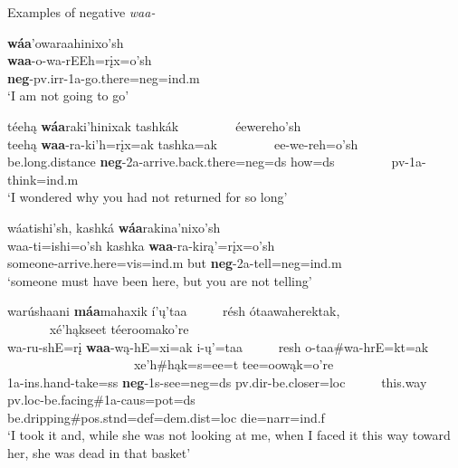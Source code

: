 \begin{exe}
\item\label{waanegation} Examples of negative \textit{waa-}

	\begin{xlist}
	
	\item\label{waanegation1}
	\glll \textbf{wáa}'owaraahinixo'sh\\
	\textbf{waa}-o-wa-rEEh=rįx=o'sh\\
	\textbf{neg}-pv.irr-1a-\textnormal{go.there}=neg=ind.m\\
	\glt `I am not going to go' \citep[48]{hollow1973a}
	
	\item\label{waanegation2}
	\glll téehą \textbf{wáa}raki'hinixak tashkák ~ ~ ~ ~ ~ éewereho'sh\\
	teehą \textbf{waa}-ra-ki'h=rįx=ak tashka=ak ~ ~ ~ ~ ~  ee-we-reh=o'sh\\
	\textnormal{be.long.distance} \textbf{neg}-2a-\textnormal{arrive.back.there}=neg=ds \textnormal{how}=ds ~ ~ ~ ~ ~ pv-1a-\textnormal{think}=ind.m\\
	\glt `I wondered why you had not returned for so long' \citep[318]{hollow1973b}
	
	\item\label{waanegation3}
	\glll wáatishi'sh, kashká \textbf{wáa}rakina'nixo'sh\\
	waa-ti=ishi=o'sh kashka \textbf{waa}-ra-kirą'=rįx=o'sh\\
	\textnormal{someone}-\textnormal{arrive.here}=vis=ind.m \textnormal{but} \textbf{neg}-2a-\textnormal{tell}=neg=ind.m\\
	\glt `someone must have been here, but you are not telling' \citep[162]{hollow1973a}

	\item\label{waanegation4}
	\glll warúshaani \textbf{máa}mahaxik í'ų'taa ~ ~ ~    résh ótaawaherektak, ~ ~ ~ ~ ~ ~ ~ ~ ~ ~ ~ ~ ~ ~ ~ xé'hąkseet téeroomako're\\
	wa-ru-shE=rį \textbf{waa}-wą-hE=xi=ak i-ų'=taa ~ ~ ~ resh o-taa\#wa-hrE=kt=ak ~ ~ ~ ~ ~ ~ ~ ~ ~ ~ ~ ~ ~ ~ ~ xe'h\#hąk=s=ee=t tee=oowąk=o're\\
	1a-ins.hand-\textnormal{take}=ss \textbf{neg}-1s-\textnormal{see}=neg=ds pv.dir-\textnormal{be.closer}=loc ~ ~ ~ \textnormal{this.way} pv.loc-\textnormal{be.facing}\#1a-caus=pot=ds ~ ~ ~ ~ ~ ~ ~ ~ ~ ~ ~ ~ ~ ~ ~ \textnormal{be.dripping}\#pos.stnd=def=dem.dist=loc \textnormal{die}=narr=ind.f\\
	\glt `I took it and, while she was not looking at me, when I faced it this way toward her, she was dead in that basket' \citep[92]{hollow1973a}
	

\end{xlist}
\end{exe}
